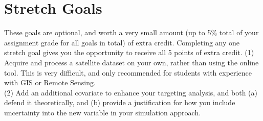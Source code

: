 \documentclass[a4paper, 11pt]{article}
\begin{document}
\section{Stretch Goals}
These goals are optional, and worth a very small amount (up to 5\% total of your assignment grade for all goals in total) of extra credit.  Completing any one stretch goal gives you the opportunity to receive all 5 points of extra credit.
(1) Acquire and process a satellite dataset on your own, rather than using the online tool.  This is very difficult, and only recommended for students with experience with GIS or Remote Sensing.\\
(2) Add an additional covariate to enhance your targeting analysis, and both (a) defend it theoretically, and (b) provide a justification for how you include uncertainty into the new variable in your simulation approach.
\end{document}
